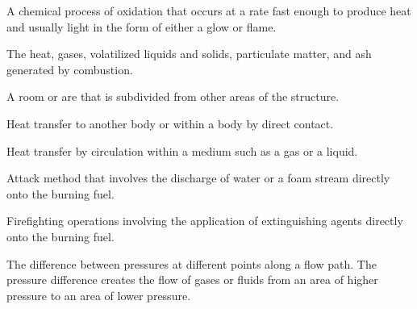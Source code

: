 \begin{description}
\item[Combustion] \hfill
\begin{description}[leftmargin=!] 
	\item A chemical process of oxidation that occurs at a rate fast enough to produce heat and usually light in the form of either a glow or flame.
\end{description}

\hypertarget{cp}{\item[Combustion Products]} \hfill
\begin{description}[leftmargin=!]
	\item The heat, gases, volatilized liquids and solids, particulate matter, and ash generated by combustion.
\end{description}

\item[Compartment] \hfill
\begin{description}[leftmargin=!]
	\item A room or are that is subdivided from other areas of the structure.
\end{description}

\item[Conduction] \hfill
\begin{description}[leftmargin=!]
	\item Heat transfer to another body or within a body by direct contact.
\end{description}

\item[Convection] \hfill
\begin{description}[leftmargin=!]
	\item Heat transfer by circulation within a medium such as a gas or a liquid. 
\end{description}

\item[Direct Attack] \hfill
\begin{description}[leftmargin=!]
	\item Attack method that involves the discharge of water or a foam stream directly onto the burning fuel.
	\item Firefighting operations involving the application of extinguishing agents directly onto the burning fuel.
\end{description}

\item[Differential Pressure] \hfill
\begin{description}[leftmargin=!]
	\item The difference between pressures at different points along a flow path.  The pressure difference creates the flow of gases or fluids from an area of higher pressure to an area of lower pressure.
\end{description}


\end{description}
